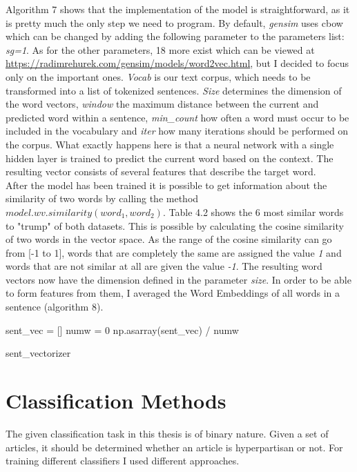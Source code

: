 \documentclass[a4paper, 11pt,titlepage,oneside,openany]{book}
\begin{document}
 Algorithm 7 shows that the implementation of the model is straightforward, as it is pretty much the only step we need to program. By default, \textit{gensim} uses \gls{cbow} which can be  changed  by adding the following parameter to the parameters list: \textit{sg=1}. As for the other parameters, 18 more exist which can be viewed at \url{https://radimrehurek.com/gensim/models/word2vec.html}, but I decided to focus only on the important ones. \textit{Vocab} is our text corpus, which needs to be transformed into a list of tokenized sentences. \textit{Size} determines the dimension of the word vectors, \textit{window} the maximum distance between the current and predicted word within a sentence, \textit{min\_count}  how often a word must occur to be included in the vocabulary and \textit{iter} how many iterations  should be performed on the corpus. What exactly happens here is that a neural network with a single hidden layer is trained to predict the current word based on the context. The resulting vector consists of several features that describe the target word.\\
\noindent 
After the model has been trained it is possible to get information about the similarity of two words by calling the method $model.wv.similarity(word_1, word_2)$. Table 4.2 shows the 6 most similar words to "trump" of both datasets. This is possible by calculating the cosine similarity of two words in the vector space. As the range of the cosine similarity can go from [-1 to 1], words that are completely the same are assigned the value \textit{1} and words that are not similar at all are given the value \textit{-1}. 
\newpage
\noindent The resulting word vectors now have the dimension defined in the parameter \textit{size}. In order to be able to form features from them, I averaged the Word Embeddings of all words in a sentence (algorithm 8).\\

\begin{algorithm}[H]
	\DontPrintSemicolon
	sent\_vec = [] \;
	numw =  0 \;
	\Return np.asarray(sent\_vec) / numw
	\caption{sent\_vectorizer}
\end{algorithm}

\section{Classification Methods}
The given classification task in this thesis is of binary nature. Given a set of articles, it should be determined whether an article is hyperpartisan or not. For training different classifiers I used different approaches. \\
\end{document}
